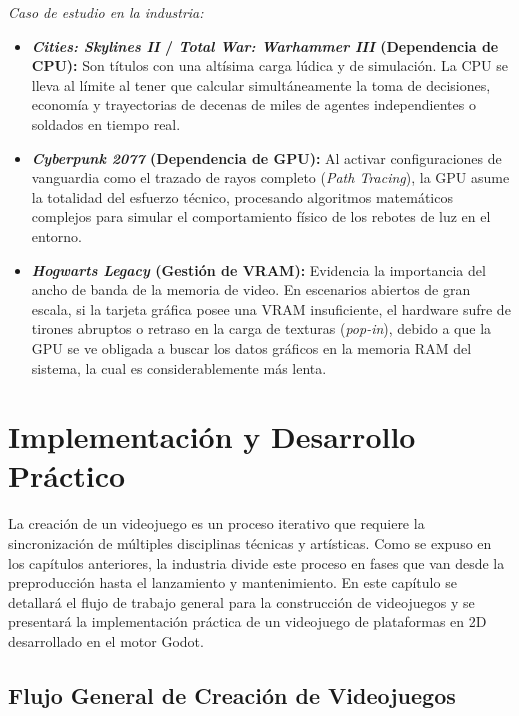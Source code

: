 \documentclass[12pt]{report}
\begin{document}
\textit{Caso de estudio en la industria:}
\begin{itemize}
    \item \textbf{\textit{Cities: Skylines II} / \textit{Total War: Warhammer III} (Dependencia de CPU):} Son títulos con una altísima carga lúdica y de simulación. La CPU se lleva al límite al tener que calcular simultáneamente la toma de decisiones, economía y trayectorias de decenas de miles de agentes independientes o soldados en tiempo real.
    \item \textbf{\textit{Cyberpunk 2077} (Dependencia de GPU):} Al activar configuraciones de vanguardia como el trazado de rayos completo (\textit{Path Tracing}), la GPU asume la totalidad del esfuerzo técnico, procesando algoritmos matemáticos complejos para simular el comportamiento físico de los rebotes de luz en el entorno.
    \item \textbf{\textit{Hogwarts Legacy} (Gestión de VRAM):} Evidencia la importancia del ancho de banda de la memoria de video. En escenarios abiertos de gran escala, si la tarjeta gráfica posee una VRAM insuficiente, el hardware sufre de tirones abruptos o retraso en la carga de texturas (\textit{pop-in}), debido a que la GPU se ve obligada a buscar los datos gráficos en la memoria RAM del sistema, la cual es considerablemente más lenta.
\end{itemize}

\chapter{Implementación y Desarrollo Práctico}

La creación de un videojuego es un proceso iterativo que requiere la sincronización de múltiples disciplinas técnicas y artísticas. Como se expuso en los capítulos anteriores, la industria divide este proceso en fases que van desde la preproducción hasta el lanzamiento y mantenimiento. En este capítulo se detallará el flujo de trabajo general para la construcción de videojuegos y se presentará la implementación práctica de un videojuego de plataformas en 2D desarrollado en el motor Godot.

\section{Flujo General de Creación de Videojuegos}
\end{document}
